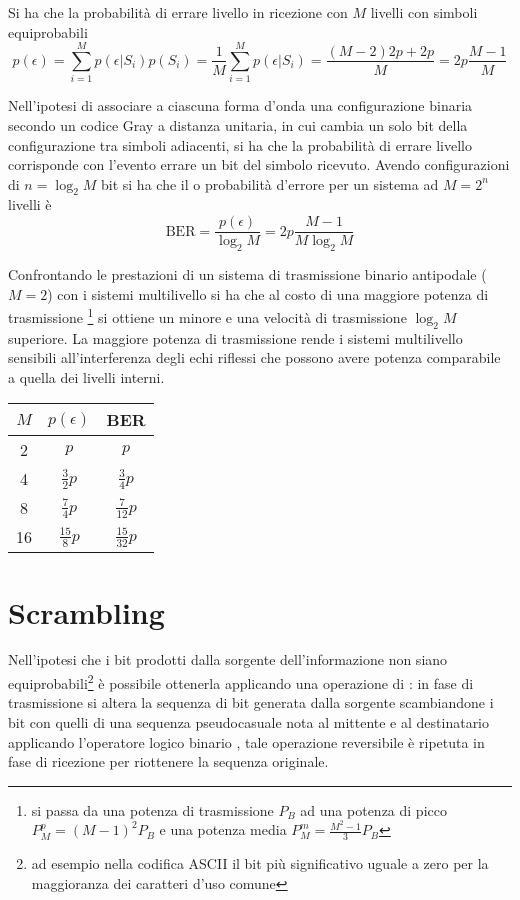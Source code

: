 Si ha che la probabilità di errare livello in ricezione con $M$ livelli con simboli equiprobabili
\begin{equation}
p(\epsilon)=\sum_{i=1}^{M}p(\epsilon|S_i)p(S_i)=\frac{1}{M}\sum_{i=1}^{M}p(\epsilon|S_i)=\frac{(M-2)2p+2p}{M}=2p\frac{M-1}{M}
\end{equation}

Nell'ipotesi di associare a ciascuna forma d'onda una configurazione binaria secondo un codice Gray a distanza unitaria, in cui cambia un solo bit della configurazione tra simboli adiacenti, si ha che la probabilità di errare livello corrisponde con l'evento errare un bit del simbolo ricevuto. Avendo configurazioni di $n=\log_2{M}$ bit si ha che il  o probabilità d'errore per un sistema ad $M=2^n$ livelli è
\begin{equation}
\text{BER}=\frac{p(\epsilon)}{\log_2{M}}=2p\frac{M-1}{M\log_2{M}}
\end{equation}

Confrontando le prestazioni di un sistema di trasmissione binario antipodale ($M=2$)  con i sistemi multilivello si ha che al costo di una maggiore potenza di trasmissione \footnote{si passa da una potenza di trasmissione $P_B$ ad una potenza di picco $P_M^p=(M-1)^2 P_B$ e una potenza media $P_M^m=\frac{M^2-1}{3}P_B$} si ottiene un minore  e una velocità di trasmissione $\log_2{M}$ superiore. La maggiore potenza di trasmissione rende i sistemi multilivello sensibili all'interferenza degli echi riflessi che possono avere potenza comparabile a quella dei livelli interni.
\begin{table}[ht]
\centering
\begin{tabular}{ccc}
$M$ & $p(\epsilon)$ & BER \\ \hline
2	& $p$ & $p$ \\
4	& $\frac{3}{2}p$ & $\frac{3}{4}p$ \\
8	& $\frac{7}{4}p$ & $\frac{7}{12}p$ \\
16	& $\frac{15}{8}p$ & $\frac{15}{32}p$ \\
\end{tabular}
\end{table}

\section{Scrambling}
Nell'ipotesi che i bit prodotti dalla sorgente dell'informazione non siano equiprobabili\footnote{ad esempio nella codifica ASCII il bit più significativo uguale a zero per la maggioranza dei caratteri d'uso comune} è possibile ottenerla applicando una operazione di : in fase di trasmissione si altera la sequenza di bit generata dalla sorgente scambiandone i bit con quelli di una sequenza pseudocasuale nota al mittente e al destinatario applicando l'operatore logico binario , tale operazione reversibile è ripetuta in fase di ricezione per riottenere la sequenza originale.

